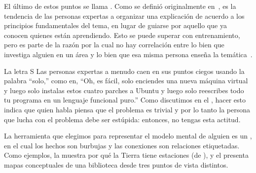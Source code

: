El último de estos puntos se llama .
Como se definió originalmente en~\cite{Nath2003},
es la tendencia de las personas expertas a organizar una explicación de acuerdo a los principios fundamentales del tema,
en lugar de guiarse por aquello que ya conocen quienes están aprendiendo.
Esto se puede superar con entrenamiento,
pero es parte de la razón por la cual no hay correlación entre
lo bien que investiga alguien en un área
y lo bien que esa misma persona enseña la temática~\cite{Mars2002}.

\begin{aside}{La letra S}
 Las personas expertas a menudo caen en sus puntos ciegos usando la palabra ``solo,''
  como en,
  ``Oh, es fácil, solo enciendes una nueva máquina virtual
  y luego solo instalas estos cuatro parches a Ubuntu
  y luego solo reescribes todo tu programa en un lenguaje funcional puro.''
  Como discutimos en el ,
  hacer esto indica que quien habla piensa que el problema es trivial
  y por lo tanto la persona que lucha con el problema debe ser estúpida:
  entonces, no tengas esta actitud.


\end{aside}


La herramienta que elegimos para representar el modelo mental de alguien es un ,
en el cual los hechos son burbujas y las conexiones son relaciones etiquetadas.
Como ejemplos, la
 muestra por qué la Tierra tiene estaciones (de ),
y el  presenta mapas conceptuales de una biblioteca desde tres puntos de vista distintos.



